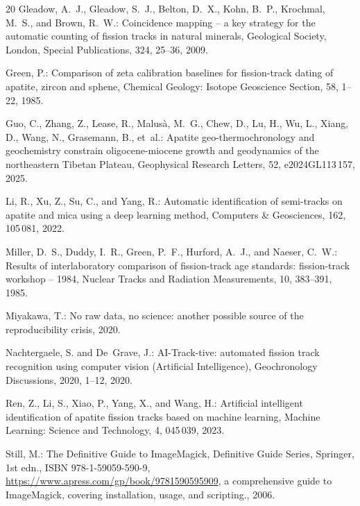 \documentclass[gchron, manuscript]{copernicus}
\begin{document}
\begin{thebibliography}{20}
Gleadow, A.~J., Gleadow, S.~J., Belton, D.~X., Kohn, B.~P., Krochmal, M.~S.,
  and Brown, R.~W.: Coincidence mapping -- a key strategy for the automatic
  counting of fission tracks in natural minerals, Geological Society, London,
  Special Publications, 324, 25--36, 2009.

Green, P.: Comparison of zeta calibration baselines for fission-track dating of
  apatite, zircon and sphene, Chemical Geology: Isotope Geoscience Section, 58,
  1--22, 1985.

Guo, C., Zhang, Z., Lease, R., Malus{\`a}, M.~G., Chew, D., Lu, H., Wu, L.,
  Xiang, D., Wang, N., Grasemann, B., et~al.: {Apatite geo-thermochronology and
  geochemistry constrain oligocene-miocene growth and geodynamics of the
  northeastern Tibetan Plateau}, Geophysical Research Letters, 52,
  e2024GL113\,157, 2025.

Li, R., Xu, Z., Su, C., and Yang, R.: Automatic identification of semi-tracks
  on apatite and mica using a deep learning method, Computers \& Geosciences,
  162, 105\,081, 2022.

Miller, D.~S., Duddy, I.~R., Green, P.~F., Hurford, A.~J., and Naeser, C.~W.:
  Results of interlaboratory comparison of fission-track age standards:
  fission-track workshop -- 1984, Nuclear Tracks and Radiation Measurements,
  10, 383--391, 1985.

Miyakawa, T.: No raw data, no science: another possible source of the
  reproducibility crisis, 2020.

Nachtergaele, S. and De~Grave, J.: {AI-Track-tive: automated fission track
  recognition using computer vision (Artificial Intelligence)}, Geochronology
  Discussions, 2020, 1--12, 2020.

Ren, Z., Li, S., Xiao, P., Yang, X., and Wang, H.: Artificial intelligent
  identification of apatite fission tracks based on machine learning, Machine
  Learning: Science and Technology, 4, 045\,039, 2023.

Still, M.: The Definitive Guide to ImageMagick, Definitive Guide Series,
  Springer, 1st edn., ISBN 978-1-59059-590-9,
  \urlprefix\url{https://www.apress.com/gp/book/9781590595909}, a comprehensive
  guide to ImageMagick, covering installation, usage, and scripting., 2006.


\end{thebibliography}
\end{document}
